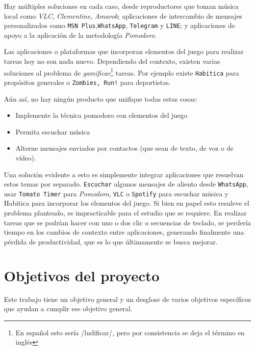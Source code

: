 \documentclass[12pt,letterpaper]{report}
\providecommand{\tightlist}{%
  \setlength{\itemsep}{0pt}\setlength{\parskip}{0pt}}
\begin{document}
Hay múltiples soluciones en cada caso,
%
desde reproductores que toman música local como \emph{VLC},
\emph{Clementine}, \emph{Amarok}; 
%
aplicaciones de intercambio de mensajes personalizados como \texttt{MSN Plus},\texttt{WhatsApp},
\texttt{Telegram} y \texttt{LINE}; y
%
aplicaciones de apoyo a la aplicación de la metodología \emph{Pomodoro}. 

Las aplicaciones o plataformas que incorporan elementos del juego para realizar tareas hoy no son nada nuevo. Dependiendo del contexto, existen varias soluciones al problema de \emph{gamificar}\footnote{En español esto sería /ludificar/, pero por consistencia se deja el término en inglés} tareas. Por ejemplo existe \texttt{Habitica} para propósitos generales o \texttt{Zombies, Run!} para deportistas.

Aún así, no hay ningún producto que unifique todas estas cosas:

\begin{itemize}
\tightlist
\item
  Implemente la técnica pomodoro con elementos del juego
\item
  Permita escuchar música
\item
  Alterne mensajes  enviados por contactos (que sean de texto, de voz o de vídeo).
\end{itemize}

Una solución evidente a esto es simplemente integrar aplicaciones que resuelvan estos temas por separado. \texttt{Escuchar} algunos mensajes de aliento desde \texttt{WhatsApp}, usar \texttt{Tomato Timer} para \emph{Pomodoro}, \texttt{VLC} o \texttt{Spotify} para escuchar música y Habitica para incorporar los elementos del juego. Si bien en papel esto resuleve el problema planteado, es impracticable para el estudio que se requiere. En realizar tareas que se podrían hacer con uno o dos clic o secuencias de teclado, se perdería tiempo en los cambios de contexto entre aplicaciones, generando finalmente una pérdida de productividad, que es lo que últimamente se busca mejorar.

\newpage
\hypertarget{objetivos-del-proyecto}{%
\section{Objetivos del proyecto}\label{objetivos-del-proyecto}}

Este trabajo tiene un objetivo general y un desglose de varios objetivos
específicos que ayudan a cumplir ese objetivo general.
\end{document}
